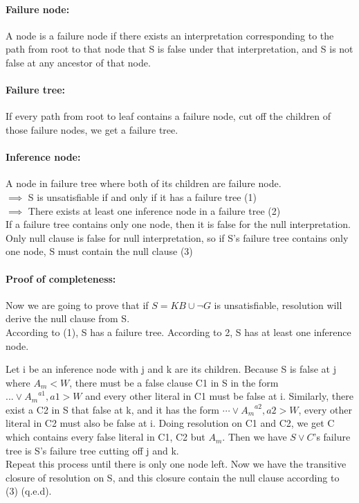 \documentclass[part1.tex]{subfiles}
\begin{document}
\paragraph{Failure node: } A node is a failure node if there exists an interpretation corresponding to
the path from root to that node that S is false under that interpretation, and S is not false at 
any ancestor of that node.\\
\paragraph{Failure tree: } If every path from root to leaf contains a failure node, cut off the children
of those failure nodes, we get a failure tree.\\
\paragraph{Inference node: } A node in failure tree where both of its children are failure node.\\
\(\implies\) S is unsatisfiable if and only if it has a failure tree (1)\\
\(\implies\) There exists at least one inference node in a failure tree (2)\\
If a failure tree contains only one node, then it is false for the null interpretation.
Only null clause is false for null interpretation, so if S's failure tree contains only one node, S
must contain the null clause (3)\\
%
\paragraph{Proof of completeness: } Now we are going to prove that if \(S = KB \cup \neg G\) is 
unsatisfiable, resolution will derive the null clause from S. \\
According to (1), S has a failure tree. According to 2, S has at least one inference node.\\


Let i be an inference node with j and k are its children. Because S is false at j where \(A_m < W\),
there must be a false clause C1 in S in the form \(...\vee {A_{m}}^{a1}, a1 > W\) and every other 
literal in C1 must be false at i. Similarly, there exist a C2 in S that false at k, and it has the form 
\(\cdots\vee {A_{m}}^{a2}, a2 > W\), every other literal in C2 must also be false at i.
Doing resolution on C1 and C2, we get C which contains every false literal in C1, C2 but \(A_{m}\).
Then we have \(S \vee C\)'s failure tree is S's failure tree cutting off j and k.\\
Repeat this process until there is only one node left. Now we have the transitive closure of resolution
on S, and this closure contain the null clause according to (3) (q.e.d).
\\
\end{document}
